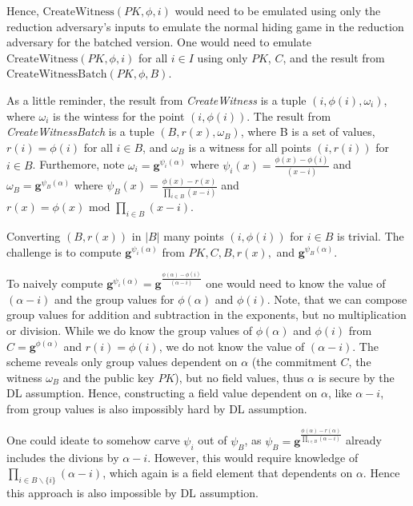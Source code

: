 Hence, $\text{CreateWitness}(PK,\phi,i)$ would need to be emulated using only the reduction adversary's inputs to emulate the normal hiding game in the reduction adversary for the batched version. 
One would need to emulate $\text{CreateWitness}(PK,\phi,i)$ for all $i \in I$ using only $PK$, $C$, and the result from $\text{CreateWitnessBatch}(PK,\phi,B)$.

As a little reminder, the result from \textit{CreateWitness} is a tuple $(i, \phi(i), \omega_i)$, where $\omega_i$ is the wintess for the point $(i,\phi(i))$. The result from \textit{CreateWitnessBatch} is a tuple $(B, r(x), \omega_B)$, where B is a set of values, $r(i)=\phi(i)$ for all $i\in B$, and $\omega_B$ is a witness for all points $(i,r(i))$ for $i\in B$.
Furthemore, note $\omega_i = \mathbf{g}^{\psi_i(\alpha)}$ where $\psi_i(x)=\frac{\phi(x)-\phi(i)}{(x-i)}$ and $\omega_B = \mathbf{g}^{\psi_B(\alpha)}$ where $\psi_B(x)=\frac{\phi(x)-r(x)}{\prod_{i \in B}^{}(x-i)}$ and $r(x)=\phi(x) \text{ mod } \prod_{i \in B}^{}(x-i)$.

Converting $(B,r(x))$ in $|B|$ many points $(i,\phi(i))$ for $i \in B$ is trivial.
The challenge is to compute $\mathbf{g}^{\psi_i(\alpha)}$ from $PK,C,B,r(x),$ and $\mathbf{g}^{\psi_B(\alpha)}$.

To naively compute $\mathbf{g}^{\psi_i(\alpha)}=\mathbf{g}^{\frac{\phi(\alpha)-\phi(i)}{(\alpha-i)}}$ one would need to know the value of $(\alpha-i)$ and the group values for $\phi(\alpha)$ and $\phi(i)$. Note, that we can compose group values for addition and subtraction in the exponents, but no multiplication or division. While we do know the group values of $\phi(\alpha)$ and $\phi(i)$ from $C=\mathbf{g}^{\phi(\alpha)}$ and $r(i)=\phi(i)$, we do not know the value of $(\alpha-i)$. The scheme reveals only group values dependent on $\alpha$ (the commitment $C$, the witness $\omega_B$ and the public key $PK$), but no field values, thus $\alpha$ is secure by the DL assumption. Hence, constructing a field value dependent on $\alpha$, like $\alpha-i$, from group values is also impossibly hard by DL assumption.

One could ideate to somehow carve $\psi_i$ out of $\psi_B$, as $\psi_B=\mathbf{g}^{\frac{\phi(\alpha)-r(\alpha)}{\prod_{i \in B}^{}(\alpha-i)}}$ already includes the divions by $\alpha-i$. However, this would require knowledge of $\prod_{i \in B\backslash\{i\}}^{}(\alpha-i)$, which again is a field element that dependents on $\alpha$. Hence this approach is also impossible by DL assumption.

